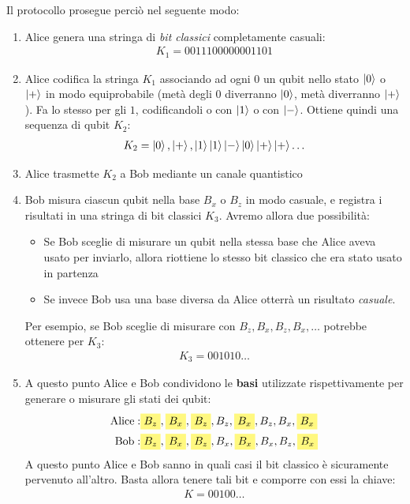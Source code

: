 \documentclass[../../InformazioneQuantistica.tex]{subfiles}
\begin{document}
Il protocollo prosegue perciò nel seguente modo:
\begin{enumerate}
\item Alice genera una stringa di \textit{bit classici} completamente casuali:
\begin{align*}
K_1=0011100000001101
\end{align*}
\item Alice codifica la stringa $K_1$ associando ad ogni $0$ un qubit nello stato $\Ket{0}$ o $\Ket{+}$ in modo equiprobabile (metà degli $0$ diverranno $\Ket{0}$, metà diverranno $\Ket{+}$). Fa lo stesso per gli $1$, codificandoli o con $\Ket{1}$ o con $\Ket{-}$. Ottiene quindi una sequenza di qubit $K_2$:
\begin{align*}
K_2 =\Ket{0},\Ket{+},\Ket{1}\Ket{1}\Ket{-}\Ket{0}\Ket{+}\Ket{+}\dots
\end{align*}
\item Alice trasmette $K_2$ a Bob mediante un canale quantistico
\item Bob misura ciascun qubit nella base $B_x$ o $B_z$ in modo casuale, e registra i risultati in una stringa di bit classici $K_3$. Avremo allora due possibilità:
\begin{itemize}
\item Se Bob sceglie di misurare un qubit nella stessa base che Alice aveva usato per inviarlo, allora riottiene lo stesso bit classico che era stato usato in partenza
\item Se invece Bob usa una base diversa da Alice otterrà un risultato \textit{casuale}.
\end{itemize}
Per esempio, se Bob sceglie di misurare con $B_z, B_x, B_z, B_x, \dots$ potrebbe ottenere per $K_3$:
\begin{align*}
K_3 = 001010\dots
\end{align*}
\item A questo punto Alice e Bob condividono le \textbf{basi} utilizzate rispettivamente per generare o misurare gli stati dei qubit:
\begin{align*}
\text{Alice}: &\hlc{Yellow}{B_z}, \hlc{Yellow}{B_x}, \hlc{Yellow}{B_z}, B_z, \hlc{Yellow}{B_x}, B_z, B_x, \hlc{Yellow}{B_x}\\
\text{Bob}: &\hlc{Yellow}{B_z}, \hlc{Yellow}{B_x}, \hlc{Yellow}{B_z}, B_x, \hlc{Yellow}{B_x}, B_x, B_z, \hlc{Yellow}{B_x}
\end{align*}
A questo punto Alice e Bob sanno in quali casi il bit classico è sicuramente pervenuto all'altro. Basta allora tenere tali bit  e comporre con essi la chiave:
\begin{align*}
K =00100\dots
\end{align*}
\end{enumerate}
\end{document}
